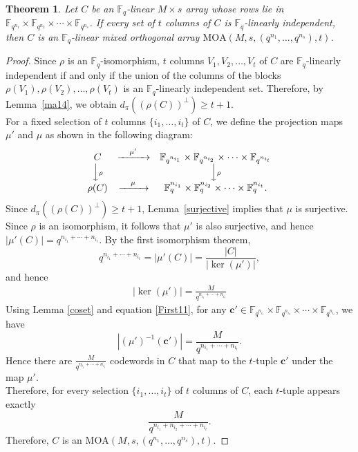 \documentclass[11pt]{article}
\newtheorem{Theorem}{Theorem}[section]
\newtheorem{Definition and Notation}[Theorem]{Definition and Notation}
\begin{document}
\begin{Theorem}\label{ma20}
Let $C$ be an $\mathbb F_q$-linear $M \times s$ array whose rows lie in $\mathbb{F}_{q^{n_1}}\times\mathbb{F}_{q^{n_2}}\times\cdots\times\mathbb{F}_{q^{n_s}}$. If every set of $t$ columns of $C$ is $\mathbb F_q$-linearly independent, then $C$ is an $\mathbb F_q$-linear mixed orthogonal array $\mathrm{MOA}\left(M, s, (q^{n_1}, \dots, q^{n_s}), t\right)$.
\end{Theorem}
\begin{proof}
Since $\rho$ is an $\mathbb F_q$-isomorphism, $t$ columns $V_1, V_2, \ldots, V_t$ of $C$ are $\mathbb F_q$-linearly independent if and only if the union of the columns of the blocks $\rho(V_1), \rho(V_2), \ldots, \rho(V_t)$ is an $\mathbb F_q$-linearly independent set. Therefore, by Lemma~\ref{ma14}, we obtain $d_\pi((\rho(C))^\perp)\geq t+1$.\\
For a fixed selection of $t$ columns $\{i_1,\ldots,i_t\}$ of $C$, we define the projection maps $\mu'$ and $\mu$ as shown in the following diagram:
  \begin{align}
\begin{array}{ccc}
C & \xrightarrow{\quad \mu'\quad} & \mathbb{F}_{q^{n_{i_1}}}\times\mathbb{F}_{q^{n_{i_2}}}\times\cdots\times\mathbb{F}_{q^{n_{i_t}}} \\
\Big\downarrow{\scriptstyle \rho} &  & \Big\downarrow{\scriptstyle \rho} \\
\rho(C) & \xrightarrow{\quad \mu \quad} & \mathbb{F}_{q}^{n_{i_1}}\times\mathbb{F}_{q}^{n_{i_2}}\times\cdots\times\mathbb{F}_{q}^{n_{i_t}}.
\end{array}
\end{align} 
Since $d_\pi((\rho(C))^\perp)\ge t+1$, Lemma~\ref{surjective} implies that $\mu$ is surjective. Since $\rho$ is an isomorphism, it follows that $\mu'$ is also surjective, and hence $ |\mu'(C)|=q^{n_{i_1} + \cdots + n_{i_t}}.$ By the first isomorphism theorem,
$$ q^{n_{i_1} + \cdots + n_{i_t}}=|\mu'(C)|= \frac{|C|}{|\ker(\mu')|},$$
and hence
\begin{align}\label{First11}
    |\ker(\mu')| = \frac{M}{q^{n_{i_1} + \cdots + n_{i_t}}}
\end{align}
Using Lemma \ref{coset} and equation \eqref{First11}, for any  $\boldsymbol{c}' \in  \mathbb{F}_{q^{n_{i_1}}} \times \mathbb{F}_{q^{n_{i_2}}}\times \cdots \times \mathbb{F}_{q^{n_{i_t}}}$,  we have 
$$
|(\mu')^{-1}(\boldsymbol{c}')|=\frac{M}{q^{n_{i_1} + \cdots + n_{i_t}}}.
$$
Hence there are $\frac{M}{q^{n_{i_1} + \cdots + n_{i_t}}}$ codewords in $C$ that map to the  $t$-tuple $\mathbf{c}'$ under the map $\mu'$. \\
Therefore, for every selection $\{i_1,\ldots,i_t\}$ of $t$ columns of $C$, each $t$-tuple appears exactly
$$\frac{M}{q^{n_{i_1} + n_{i_2} + \cdots + n_{i_t}}}.$$  Therefore, $C$ is an $ \mathrm{MOA}\left(M, s, (q^{n_1},\dots, q^{n_s}), t\right)$.
\end{proof}
\end{document}

